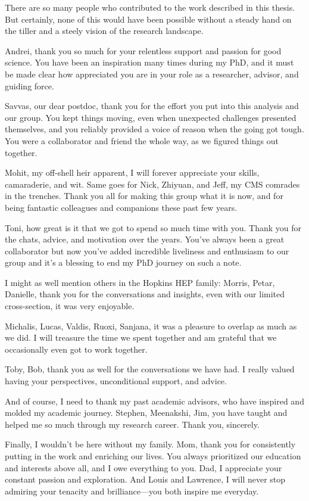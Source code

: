 

There are so many people who contributed to the work described in this thesis. But certainly, none of this would have been possible without a steady hand on the tiller and a steely vision of the research landscape. 

Andrei, thank you so much for your relentless support and passion for good science. You have been an inspiration many times during my PhD, and it must be made clear how appreciated you are in your role as a researcher, advisor, and guiding force. 

Savvas, our dear postdoc, thank you for the effort you put into this analysis and our group. You kept things moving, even when unexpected challenges presented themselves, and you reliably provided a voice of reason when the going got tough. You were a collaborator and friend the whole way, as we figured things out together. 

Mohit, my off-shell heir apparent, I will forever appreciate your skills, camaraderie, and wit. Same goes for Nick, Zhiyuan, and Jeff, my CMS comrades in the trenches. Thank you all for making this group what it is now, and for being fantastic colleagues and companions these past few years. 

Toni, how great is it that we got to spend so much time with you. Thank you for the chats, advice, and motivation over the years. You've always been a great collaborator but now you've added incredible liveliness and enthusiasm to our group and it's a blessing to end my PhD journey on such a note. 

I might as well mention others in the Hopkins HEP family: Morris, Petar, Danielle, thank you for the conversations and insights, even with our limited cross-section, it was very enjoyable. 

Michalis, Lucas, Valdis, Ruoxi, Sanjana, it was a pleasure to overlap as much as we did. I will treasure the time we spent together and am grateful that we occasionally even got to work together. 

Toby, Bob, thank you as well for the conversations we have had. I really valued having your perspectives, unconditional support, and advice. 

And of course, I need to thank my past academic advisors, who have inspired and molded my academic journey. Stephen, Meenakshi, Jim, you have taught and helped me so much through my research career. Thank you, sincerely.

Finally, I wouldn't be here without my family. Mom, thank you for consistently putting in the work and enriching our lives. You always prioritized our education and interests above all, and I owe everything to you. Dad, I appreciate your constant passion and exploration. And Louis and Lawrence, I will never stop admiring your tenacity and brilliance---you both inspire me everyday. 
